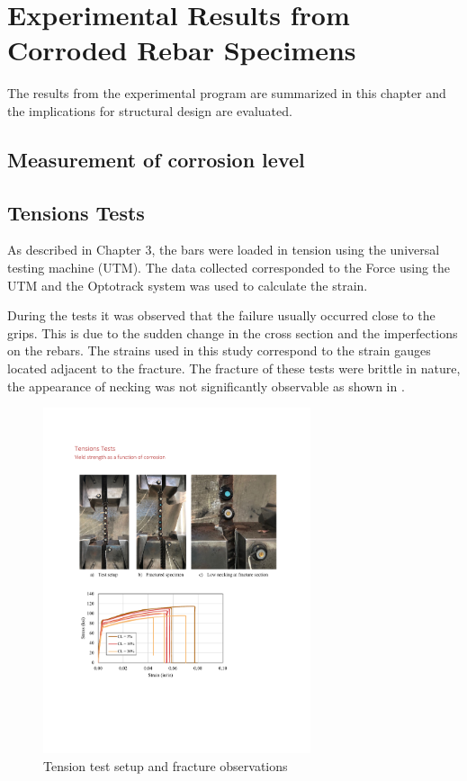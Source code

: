 \chapter{Experimental Results from Corroded Rebar Specimens}
The results from the experimental program are summarized in this chapter and the implications for structural design are evaluated.

\section{Measurement of corrosion level}

\section{Tensions Tests}

As described in Chapter 3, the bars were loaded in tension using the universal testing machine (UTM). The data collected corresponded to the Force using the UTM and the Optotrack system was used to calculate the strain.

During the tests it was observed that the failure usually occurred close to the grips. This is due to the sudden change in the cross section and the imperfections on the rebars. The strains used in this study correspond to the strain gauges located adjacent to the fracture. The fracture of these tests were brittle in nature, the appearance of necking was not significantly observable as shown in .

\begin{figure}[htbp]
	\centering
	\includegraphics[width=0.7\textwidth]{VAC Thesis 2.0/Chapter-4/figs/TensionTest_images.pdf}
	\caption{Tension test setup and fracture observations}
	\label{fig:TensionTest_NoNecking}
\end{figure}

